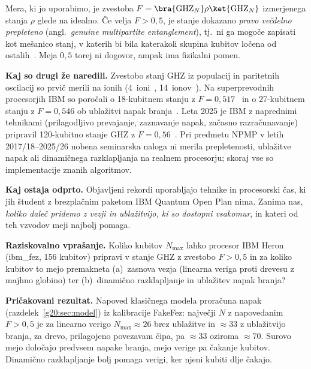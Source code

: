 Mera, ki jo uporabimo, je zvestoba $F=\bra{\mathrm{GHZ}_N}\rho\ket{\mathrm{GHZ}_N}$ izmerjenega stanja $\rho$ glede na
idealno. Če velja $F>0{,}5$, je stanje dokazano \emph{pravo večdelno prepleteno} (angl.\ \emph{genuine multipartite
entanglement}), tj.\ ni ga mogoče zapisati kot mešanico stanj, v katerih bi bila katerakoli skupina kubitov ločena od
ostalih~\cite{g20:guhne2009}. Meja $0{,}5$ torej ni dogovor, ampak ima fizikalni pomen.

\textbf{Kaj so drugi že naredili.} Zvestobo stanj GHZ iz populacij in paritetnih oscilacij so prvič merili na ionih
(4~ioni~\cite{g20:sackett2000}, 14~ionov~\cite{g20:monz2011}). Na superprevodnih procesorjih IBM so poročali o 18-kubitnem
stanju z $F=0{,}517$~\cite{g20:wei2020} in o 27-kubitnem stanju z $F=0{,}546$ ob ublažitvi napak branja~\cite{g20:mooney2021}.
Leta 2025 je IBM z naprednimi tehnikami (prilagodljivo prevajanje, zaznavanje napak, začasno razračunavanje) pripravil
120-kubitno stanje GHZ z $F=0{,}56$~\cite{g20:ibm2025bigcats}. Pri predmetu NPMP v letih 2017/18--2025/26 nobena
seminarska naloga ni merila prepletenosti, ublažitve napak ali dinamičnega razklapljanja na realnem procesorju; skoraj vse so
implementacije znanih algoritmov.

\textbf{Kaj ostaja odprto.} Objavljeni rekordi uporabljajo tehnike in procesorski čas, ki jih študent z brezplačnim
paketom IBM Quantum Open Plan nima. Zanima nas, \emph{koliko daleč pridemo z vezji in ublažitvijo, ki so dostopni vsakomur}, in
kateri od teh vzvodov meji najbolj pomaga.

\begin{svgraybox}
\textbf{Raziskovalno vprašanje.} Koliko kubitov $N_{\max}$ lahko procesor IBM Heron (ibm\_fez, 156 kubitov) pripravi v stanje
GHZ z zvestobo $F>0{,}5$ in za koliko kubitov to mejo premakneta (a)~zasnova vezja (linearna veriga proti drevesu z majhno
globino) ter (b)~dinamično razklapljanje in ublažitev napak branja?

\textbf{Pričakovani rezultat.} Napoved klasičnega modela proračuna napak (razdelek~\ref{g20:sec:model}) iz kalibracije FakeFez:
največji $N$ z napovedanim $F>0{,}5$ je za linearno verigo $N_{\max}\approx 26$ brez ublažitve in $\approx 33$ z ublažitvijo
branja, za drevo, prilagojeno povezavam čipa, pa $\approx 33$ oziroma $\approx 70$. Surovo mejo določajo predvsem napake branja, mejo verige pa čakanje kubitov.
Dinamično razklapljanje bolj pomaga verigi, ker njeni kubiti dlje čakajo.
\end{svgraybox}

